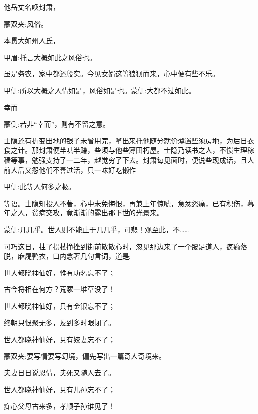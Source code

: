 \begin{parag}
    他岳丈名唤封肃，\begin{note}蒙双夹:风俗。\end{note}本贯大如州人氏，\begin{note}甲眉:托言大概如此之风俗也。\end{note}虽是务农，家中都还殷实。今见女婿这等狼狈而来，心中便有些不乐。\begin{note}甲侧:所以大概之人情如是，风俗如是也。蒙侧:大都不过如此。\end{note}幸而\begin{note}蒙侧:若非“幸而”，则有不留之意。\end{note}士隐还有折变田地的银子未曾用完，拿出来托他随分就价薄置些须房地，为后日衣食之计。那封肃便半哄半赚，些须与他些薄田朽屋。士隐乃读书之人，不惯生理稼穑等事，勉强支持了一二年，越觉穷了下去。封肃每见面时，便说些现成话，且人前人后又怨他们不善过活，只一味好吃懒作\begin{note}甲侧:此等人何多之极。\end{note}等语。士隐知投人不著，心中未免悔恨，再兼上年惊唬，急忿怨痛，已有积伤，暮年之人，贫病交攻，竟渐渐的露出那下世的光景来。\begin{note}蒙侧:几几乎。世人则不能止于几几乎，可悲！观至此，不……\end{note}
\end{parag}


\begin{parag}
    可巧这日，拄了拐杖挣挫到街前散散心时，忽见那边来了一个跛足道人，疯癫落脱，麻屣鹑衣，口内念著几句言词，道是:
\end{parag}


\begin{poem}
    \begin{pl}世人都晓神仙好，惟有功名忘不了；\end{pl}

    \begin{pl}古今将相在何方？荒冢一堆草没了！\end{pl}

    \begin{pl}世人都晓神仙好，只有金银忘不了；\end{pl}

    \begin{pl}终朝只恨聚无多，及到多时眼闭了。\end{pl}

    \begin{pl}世人都晓神仙好，只有姣妻忘不了；\end{pl}
    \begin{note}蒙双夹:要写情要写幻境，偏先写出一篇奇人奇境来。\end{note}

    \begin{pl}夫妻日日说恩情，夫死又随人去了。\end{pl}

    \begin{pl}世人都晓神仙好，只有儿孙忘不了；\end{pl}

    \begin{pl}痴心父母古来多，孝顺子孙谁见了！\end{pl}
\end{poem}


